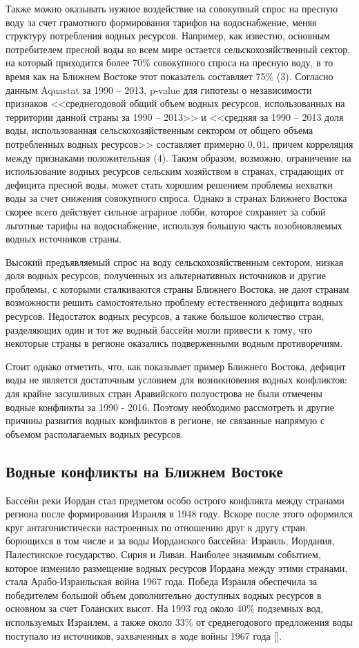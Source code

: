 \documentclass[a4paper, 12pt]{article}
\theoremstyle{plain} %
\theoremstyle{definition} %
\theoremstyle{remark} %
\begin{document}
Также можно оказывать нужное воздействие на совокупный спрос на пресную воду за счет грамотного формирования тарифов на водоснабжение, меняя структуру потребления водных ресурсов. Например, как известно, основным потребителем пресной воды во всем мире остается сельскохозяйственный сектор, на который приходится более 70\% совокупного спроса на пресную воду, в то время как на Ближнем Востоке этот показатель составляет 75\% (3). Согласно данным Aquastat за 1990 – 2013, p-value для гипотезы о независимости признаков <<среднегодовой общий объем водных ресурсов, использованных на территории данной страны за 1990 – 2013>> и <<средняя за 1990 – 2013 доля воды, использованная сельскохозяйственным сектором от общего объема потребленных водных ресурсов>> составляет примерно $0,01$, причем корреляция между признаками положительная (4). Таким образом, возможно, ограничение на использование водных ресурсов сельским хозяйством в странах, страдающих от дефицита пресной воды, может стать хорошим решением проблемы нехватки воды за счет снижения совокупного спроса. Однако в странах Ближнего Востока скорее всего действует сильное аграрное лобби, которое сохраняет за собой льготные тарифы на водоснабжение, используя большую часть возобновляемых водных источников страны. 

Высокий предъявляемый спрос на воду сельскохозяйственным сектором, низкая доля водных ресурсов, полученных из альтернативных источников и другие проблемы, с которыми сталкиваются страны Ближнего Востока, не дают странам возможности решить самостоятельно проблему естественного дефицита водных ресурсов. Недостаток водных ресурсов, а также большое количество стран, разделяющих один и тот же водный бассейн могли привести к тому, что некоторые страны в регионе оказались подверженными водным противоречиям. 

Стоит однако отметить, что, как показывает пример Ближнего Востока, дефицит воды не является достаточным условием для возникновения водных конфликтов: для крайне засушливых стран Аравийского полуострова не были отмечены водные конфликты за 1990 - 2016. Поэтому необходимо рассмотреть и другие причины развития водных конфликтов в регионе, не связанные напрямую с объемом располагаемых водных ресурсов.

\subsection{Водные конфликты на Ближнем Востоке}
Бассейн реки Иордан стал предметом особо острого конфликта между странами региона после формирования Израиля в 1948 году. Вскоре после этого оформился круг антагонистически настроенных по отношению друг к другу стран, борющихся в том числе и за воды Иорданского бассейна: Израиль, Иордания, Палестинское государство, Сирия и Ливан. Наиболее значимым событием, которое изменило размещение водных ресурсов Иордана между этими странами, стала Арабо-Израильская война 1967 года. Победа Израиля обеспечила за победителем большой объем дополнительно доступных водных ресурсов в основном за счет Голанских высот. На 1993 год около 40\% подземных вод, используемых Израилем, а также около 33\% от среднегодового предложения воды поступало из источников, захваченных в ходе войны 1967 года [\cite{gleick1993}].
 
\end{document}
